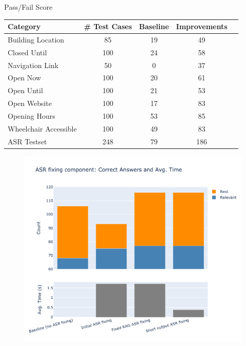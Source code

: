 \documentclass{sdqbeamer}[smallfoot]
\begin{document}
\begin{frame}[t]{Pass/Fail Score}
\begin{table}[H]
    \centering
        \begin{tabular}{|l|c|c|c|c|}
        \hline
        \textbf{Category} & \textbf{\# Test Cases} & \textbf{Baseline} & \textbf{Improvements} \\
        \hline
        Building Location     & 85  & 19  & 49 \\
        Closed Until          & 100 & 24  & 58 \\
        Navigation Link       & 50  & 0   & 37 \\
        Open Now              & 100 & 20  & 61 \\
        Open Until            & 100 & 21  & 53 \\
        Open Website          & 100 & 17  & 83 \\
        Opening Hours         & 100 & 53  & 85 \\
        Wheelchair Accessible & 100 & 49  & 83 \\
        ASR Testset           & 248 & 79  & 186 \\
        \hline
    \end{tabular}
\end{table}
\end{frame}

\begin{frame}[t]
    \vspace{-1cm}
	\begin{figure}
	    \centering
	    \includegraphics[width=0.65\linewidth]{images/pareto_frontier_improvements.png}
	\end{figure}
\end{frame}
\end{document}
